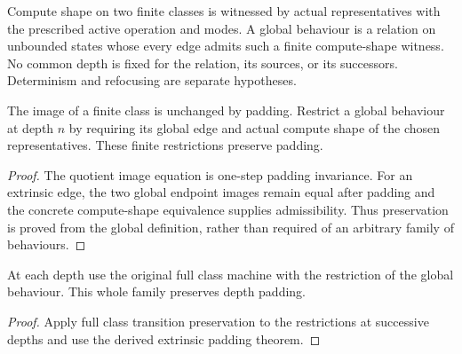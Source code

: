 


\begin{definition}
Compute shape on two finite classes is witnessed by actual representatives with the prescribed active operation and modes. A global behaviour is a relation on unbounded states whose every edge admits such a finite compute-shape witness. No common depth is fixed for the relation, its sources, or its successors. Determinism and refocusing are separate hypotheses.
\end{definition}




\begin{lemma}
The image of a finite class is unchanged by padding. Restrict a global behaviour at depth $n$ by requiring its global edge and actual compute shape of the chosen representatives. These finite restrictions preserve padding.
\end{lemma}

\begin{proof}
The quotient image equation is one-step padding invariance. For an extrinsic edge, the two global endpoint images remain equal after padding and the concrete compute-shape equivalence supplies admissibility. Thus preservation is proved from the global definition, rather than required of an arbitrary family of behaviours.
\end{proof}





\begin{lemma}
At each depth use the original full class machine with the restriction of the global behaviour. This whole family preserves depth padding.
\end{lemma}

\begin{proof}
Apply full class transition preservation to the restrictions at successive depths and use the derived extrinsic padding theorem.
\end{proof}

